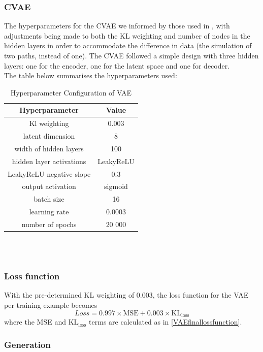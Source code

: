 \documentclass{article}
\theoremstyle{definition}
\begin{document}
\subsubsection{CVAE}
The hyperparameters for the CVAE we informed by those used in \cite{buehler2020data}, with adjustments being made to both the KL weighting and number of nodes in the hidden layers in order to accommodate the difference in data (the simulation of two paths, instead of one). The CVAE followed a simple design with three hidden layers: one for the encoder, one for the latent space and one for decoder.\\
The table below summarises the hyperparameters used:
\begin{table}[h]
\centering
\begin{tabular}{|c|c|}
\hline
\textbf{Hyperparameter} & \textbf{Value} \\
\hline
Kl weighting & 0.003 \\
latent dimension & 8 \\
width of hidden layers & 100 \\
hidden layer activations & LeakyReLU\\
LeakyReLU negative slope & 0.3\\
output activation & sigmoid \\
batch size & 16 \\
learning rate & 0.0003 \\
number of epochs & 20 000 \\
\hline
\end{tabular}
\caption{Hyperparameter Configuration of VAE}
\label{tab:hyperparams}
\end{table}
\\\\
\subsubsection{Loss function}
With the pre-determined KL weighting of 0.003, the loss function for the VAE per training example becomes $$Loss = 0.997 \times \text{MSE} + 0.003 \times \text{KL}_{\text{loss}}$$ where the MSE and $\text{KL}_{\text{loss}}$ terms are calculated as in \ref{VAEfinallossfunction}.
\subsubsection{Generation}
\end{document}

